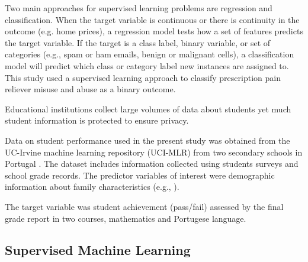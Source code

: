 \documentclass[sigconf]{acmart}
\begin{document}
Two main approaches for supervised learning 
problems are regression and classification. When the target variable
is continuous or there is continuity in the outcome (e.g. home prices), a 
regression model tests how a set of features predicts the target variable. 
If the target is a class label, binary variable, or set of categories 
(e.g., spam or ham emails, benign or malignant cells), a classification model 
will predict which class or category label new instances are assigned to. 
This study used a supervised learning approach to classify prescription pain
reliever misuse and abuse as a binary outcome. 


Educational institutions collect large volumes of data about students yet 
much student information is protected to ensure privacy. 

Data on student performance used in the present study was obtained from the
UC-Irvine machine learning repository (UCI-MLR) from two secondary schools 
in Portugal \cite{cortez09}. The dataset includes information collected using
students surveys and school grade records. The predictor variables of interest
were demographic information about family characteristics (e.g., ).

The target variable was student achievement (pass/fail) assessed by the 
final grade report in two courses, mathematics and Portugese language. 





\subsection{Supervised Machine Learning} 
\end{document}
